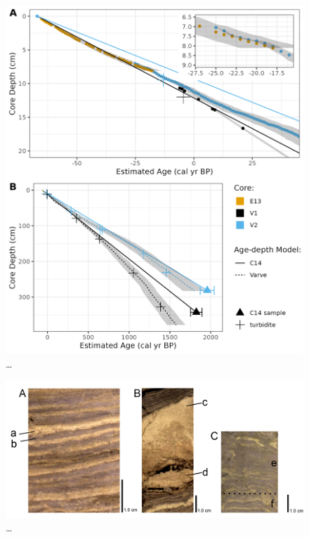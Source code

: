 \documentclass[
  letterpaper,
  DIV=11,
  numbers=noendperiod]{scrartcl}
\begin{document}
\begin{figure}

{\centering \includegraphics[width=1\textwidth,height=\textheight]{figs/longcore_cumulative_depth_vs_estimated_year_w_ams_and_varve.png}

}

\caption{\label{fig-amsRates}\ldots{}}

\end{figure}

\begin{figure}

{\centering \includegraphics[width=1\textwidth,height=\textheight]{figs/good_vs_flood_vs_disturbed_varves_.png}

}

\caption{\label{fig-varve-turb}\ldots{}}

\end{figure}
\end{document}

